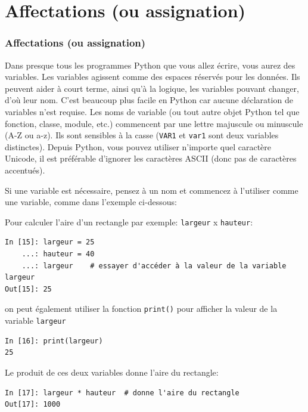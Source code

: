 \documentclass{beamer}
\begin{document}
\section{Affectations (ou assignation)}

\begin{frame}
\frametitle{Affectations (ou assignation)}



Dans presque tous les programmes Python que vous allez écrire, vous aurez des variables. Les variables agissent comme des espaces réservés pour les données. Ils peuvent aider à court terme, ainsi qu’à la logique, les variables pouvant changer, d’où leur nom. C’est beaucoup plus facile en Python car aucune déclaration de variables n’est requise. Les noms de variable (ou tout autre objet Python tel que fonction, classe, module, etc.) commencent par une lettre majuscule ou minuscule (A-Z ou a-z). Ils sont sensibles à la casse (\texttt{VAR1} et \texttt{var1} sont deux variables distinctes). Depuis Python, vous pouvez utiliser n’importe quel caractère Unicode, il est préférable d’ignorer les caractères ASCII (donc pas de caractères accentués).

Si une variable est nécessaire, pensez à un nom et commencez à l'utiliser comme une variable, comme dans l'exemple ci-dessous:


\end{frame}

\begin{frame}

Pour calculer l'aire d'un rectangle par exemple: \texttt{largeur} x \texttt{hauteur}:

\begin{verbatim}
In [15]: largeur = 25
    ...: hauteur = 40
    ...: largeur    # essayer d'accéder à la valeur de la variable largeur
Out[15]: 25
\end{verbatim}

on peut également utiliser la fonction \texttt{print()} pour afficher la valeur de la variable \texttt{largeur}

\begin{verbatim}
In [16]: print(largeur)
25
\end{verbatim}
Le produit de ces deux variables donne l'aire du rectangle:
\begin{verbatim}
In [17]: largeur * hauteur  # donne l'aire du rectangle
Out[17]: 1000
\end{verbatim}
\end{frame}
\end{document}
